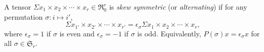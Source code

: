 A tensor $\Sigma x_1 \times x_2 \times \cdots \times x_r \in \Re_0^r$ is \textit{skew symmetric} (or \textit{alternating}) if for any permutation $\sigma: i \mapsto i'$,
$$\Sigma x_{1'} \times x_{2'} \times \cdots \times x_{r'} = \epsilon_\sigma \Sigma x_1 \times x_2 \times \cdots \times x_r,$$
where $\epsilon_\sigma = 1$ if $\sigma$ is even and $\epsilon_\sigma = -1$ if $\sigma$ is odd.
Equivalently, $P(\sigma)x = \epsilon_\sigma x$ for all $\sigma \in \mathfrak{S}_r$.
